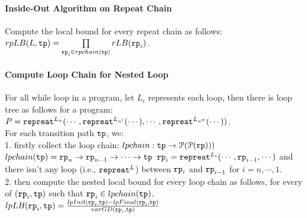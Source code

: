 \paragraph*{Inside-Out Algorithm on Repeat Chain}
Compute the local bound for every repeat chain as follows:
\\
$rpLB(L, \mathtt{tp}) = \prod\limits_{\mathtt{rp}_i \in rpchain(\mathtt{tp})}
rLB(\mathtt{rp}_i)$.
%
\paragraph*{Compute Loop Chain for Nested Loop}
For all while loop in a program, let $L_i$ represents each loop,
then there is loop tree as follows for a program:
$P = \mathtt{repreat}^{L_n}(\cdots, \mathtt{repreat}^{L_{n'}}(\cdots), \cdots, \mathtt{repreat}^{L_{n''}}(\cdots))$.
\\
For each transition path $\mathtt{tp}$, we:
\\
1. firstly collect the loop chain: 
$lpchain : \mathtt{tp} \to \mathcal{P}(\mathcal{P}(\mathtt{rp})))$
\\
$lpchain(\mathtt{tp}) = \mathtt{rp}_n \to \mathtt{rp}_{n-1} \to \cdots \to \mathtt{tp}$
$\mathtt{rp}_{i}= \mathtt{repreat}^{L_i}(\cdots, \mathtt{rp}_{i - 1}, \cdots)$ and
 there isn't any loop (i.e., $\mathtt{repreat}^{L}$) between $\mathtt{rp}_{i}$ and $\mathtt{rp}_{i - 1}$ for $i = n, \cdots, 1$.
\\
2. then compute the nested local bound for every loop chain as follows, for every of 
$(\mathtt{rp}_i, \mathtt{tp})$ such that $\mathtt{rp}_i \in lpchain(\mathtt{tp})$,
\\
$lpLB(\mathtt{rp}_i, \mathtt{tp}) = 
\frac{lpInit(\mathtt{rp}_i, \mathtt{tp}) - lpFinal(\mathtt{rp}_i, \mathtt{tp})}{varGD(\mathtt{rp}_i, \mathtt{tp})}$
\\
